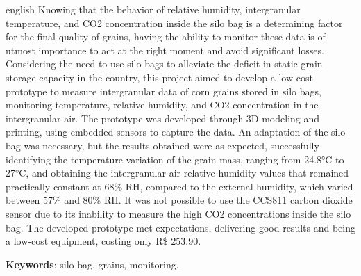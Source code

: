 \setlength{\absparsep}{18pt} %
\begin{resumo}[Abstract]
 \begin{otherlanguage*}{english}
   Knowing that the behavior of relative humidity, intergranular temperature, and CO2 concentration inside the silo bag is a determining factor for the final quality of grains, having the ability to monitor these data is of utmost importance to act at the right moment and avoid significant losses. Considering the need to use silo bags to alleviate the deficit in static grain storage capacity in the country, this project aimed to develop a low-cost prototype to measure intergranular data of corn grains stored in silo bags, monitoring temperature, relative humidity, and CO2 concentration in the intergranular air. The prototype was developed through 3D modeling and printing, using embedded sensors to capture the data. An adaptation of the silo bag was necessary, but the results obtained were as expected, successfully identifying the temperature variation of the grain mass, ranging from 24.8°C to 27°C, and obtaining the intergranular air relative humidity values that remained practically constant at 68\% RH, compared to the external humidity, which varied between 57\% and 80\% RH. It was not possible to use the CCS811 carbon dioxide sensor due to its inability to measure the high CO2 concentrations inside the silo bag. The developed prototype met expectations, delivering good results and being a low-cost equipment, costing only R\$ 253.90.
   

   \vspace{\onelineskip}
 
   \noindent 
   \textbf{Keywords}: silo bag, grains, monitoring.
 \end{otherlanguage*}
\end{resumo}